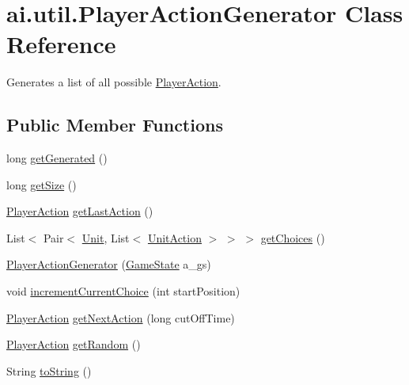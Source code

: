 \hypertarget{classai_1_1util_1_1_player_action_generator}{
\section{ai.util.PlayerActionGenerator Class Reference}
\label{classai_1_1util_1_1_player_action_generator}
}


Generates a list of all possible \hyperlink{classai_1_1util_1_1_player_action}{PlayerAction}.  


\subsection*{Public Member Functions}
\begin{DoxyCompactItemize}
\item 
long \hyperlink{classai_1_1util_1_1_player_action_generator_a9b7abb8a7dcc2cdeed0c2c62ecbaa1db}{getGenerated} ()
\item 
long \hyperlink{classai_1_1util_1_1_player_action_generator_a33a56cdf1e98464163450ad75bfc80c0}{getSize} ()
\item 
\hyperlink{classai_1_1util_1_1_player_action}{PlayerAction} \hyperlink{classai_1_1util_1_1_player_action_generator_afb2324e80bd9f1ebcebd7159edb06ade}{getLastAction} ()
\item 
List$<$ Pair$<$ \hyperlink{classrts_1_1units_1_1_unit}{Unit}, List$<$ \hyperlink{classrts_1_1units_1_1_unit_action}{UnitAction} $>$ $>$ $>$ \hyperlink{classai_1_1util_1_1_player_action_generator_a445532f043a312788592a40c13b95cf8}{getChoices} ()
\item 
\hyperlink{classai_1_1util_1_1_player_action_generator_a76a70a3899658386650e77b20929e805}{PlayerActionGenerator} (\hyperlink{classrts_1_1_game_state}{GameState} a\_\-gs)
\item 
void \hyperlink{classai_1_1util_1_1_player_action_generator_a25eff501f9c9510c3489e8c44ee4592c}{incrementCurrentChoice} (int startPosition)
\item 
\hyperlink{classai_1_1util_1_1_player_action}{PlayerAction} \hyperlink{classai_1_1util_1_1_player_action_generator_a7470abab59f97488252089281b7c88f9}{getNextAction} (long cutOffTime)
\item 
\hyperlink{classai_1_1util_1_1_player_action}{PlayerAction} \hyperlink{classai_1_1util_1_1_player_action_generator_a2e1ebc260a531359c360cb8879064745}{getRandom} ()
\item 
String \hyperlink{classai_1_1util_1_1_player_action_generator_affcfad40102297a767762b03f5968a9a}{toString} ()
\end{DoxyCompactItemize}
